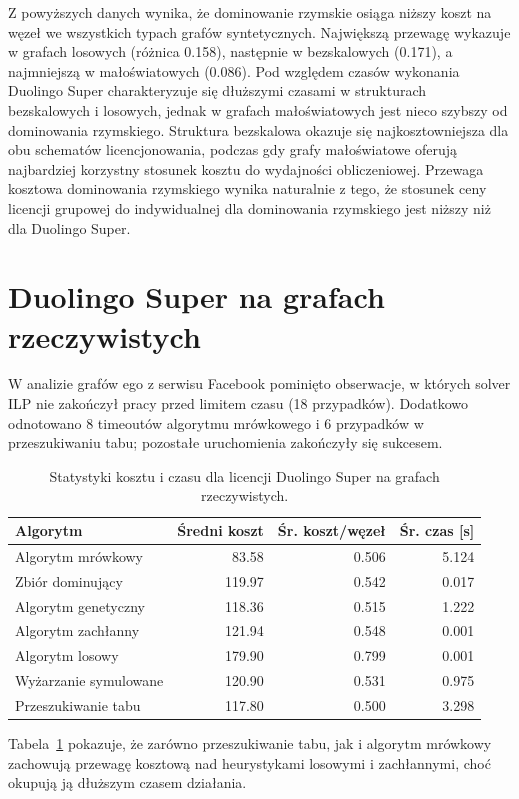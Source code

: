 Z powyższych danych wynika, że dominowanie rzymskie osiąga niższy koszt na węzeł we wszystkich typach grafów syntetycznych. Największą przewagę wykazuje w grafach losowych (różnica 0.158), następnie w bezskalowych (0.171), a najmniejszą w małoświatowych (0.086). Pod względem czasów wykonania Duolingo Super charakteryzuje się dłuższymi czasami w strukturach bezskalowych i losowych, jednak w grafach małoświatowych jest nieco szybszy od dominowania rzymskiego. Struktura bezskalowa okazuje się najkosztowniejsza dla obu schematów licencjonowania, podczas gdy grafy małoświatowe oferują najbardziej korzystny stosunek kosztu do wydajności obliczeniowej. Przewaga kosztowa dominowania rzymskiego wynika naturalnie z tego, że stosunek ceny licencji grupowej do indywidualnej dla dominowania rzymskiego jest niższy niż dla Duolingo Super.


\section{Duolingo Super na grafach rzeczywistych}
W analizie grafów ego z serwisu Facebook pominięto obserwacje, w których solver ILP nie zakończył pracy przed limitem czasu (18 przypadków). Dodatkowo odnotowano 8 timeoutów algorytmu mrówkowego i 6 przypadków w przeszukiwaniu tabu; pozostałe uruchomienia zakończyły się sukcesem.

\begin{table}[H]
  \centering
  \caption{Statystyki kosztu i czasu dla licencji Duolingo Super na grafach rzeczywistych.}
  \label{tab:duo-real-alg}
  \begin{tabular}{lrrr}
    \toprule
    \textbf{Algorytm}     & \textbf{Średni koszt} & \textbf{Śr. koszt/węzeł} & \textbf{Śr. czas [s]} \\
    \midrule
    Algorytm mrówkowy     & 83.58                 & 0.506                    & 5.124                 \\
    Zbiór dominujący      & 119.97                & 0.542                    & 0.017                 \\
    Algorytm genetyczny   & 118.36                & 0.515                    & 1.222                 \\
    Algorytm zachłanny    & 121.94                & 0.548                    & 0.001                 \\
    Algorytm losowy       & 179.90                & 0.799                    & 0.001                 \\
    Wyżarzanie symulowane & 120.90                & 0.531                    & 0.975                 \\
    Przeszukiwanie tabu   & 117.80                & 0.500                    & 3.298                 \\
    \bottomrule
  \end{tabular}
\end{table}
Tabela~\ref{tab:duo-real-alg} pokazuje, że zarówno przeszukiwanie tabu, jak i algorytm mrówkowy zachowują przewagę kosztową nad heurystykami losowymi i zachłannymi, choć okupują ją dłuższym czasem działania.


